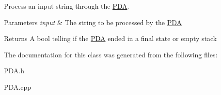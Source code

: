 Process an input string through the \hyperlink{class_p_d_a}{P\-D\-A}. 


\begin{DoxyParams}{Parameters}
{\em input} & The string to be processed by the \hyperlink{class_p_d_a}{P\-D\-A}\\
\hline
\end{DoxyParams}
\begin{DoxyReturn}{Returns}
A bool telling if the \hyperlink{class_p_d_a}{P\-D\-A} ended in a final state or empty stack 
\end{DoxyReturn}


The documentation for this class was generated from the following files\-:\begin{DoxyCompactItemize}
\item 
P\-D\-A.\-h\item 
P\-D\-A.\-cpp\end{DoxyCompactItemize}
